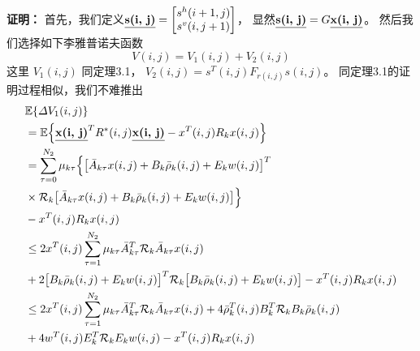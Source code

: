 	{\bf 证明：} 
	首先，我们定义$\emph{\textbf{s(i, j)}} = \begin{bmatrix}
	s^{h}(i+1,j)\\ s^{v}(i,j+1)
	\end{bmatrix}$，  显然$\emph{\textbf{s(i, j)}}=G\emph{\textbf{x(i, j)}}$。 然后我们选择如下李雅普诺夫函数
	\begin{equation}\label{LyapunoovT}
	V(i,j)=V_{1}(i,j)+V_{2}(i,j)
	\end{equation}
	这里 $V_{1}(i,j)$ 同定理3.1， $V_{2}(i,j)=s^{T}(i,j)F_{r(i,j)}s(i,j)$。 同定理3.1的证明过程相似，我们不难推出
	\begin{equation} \label{P2T1}
	\begin{split}
	&\mathbb{E}\{\varDelta V_{1}(i,j) \}\\
	&=\mathbb{E}\Big\{\emph{\textbf{x(i, j)}}^{T}R^{*}(i,j)\emph{\textbf{x(i, j)}} - x^{T}(i,j)R_{k}x(i,j)\Big\}\\
	&=  \sum_{\tau =0}^{N_{2}}\mu_{k\tau }\Big\{\big[\bar{A}_{k\tau }x(i,j)+B_{k}\bar{\rho}_{k}(i,j)+E_{k}w(i,j)\big]^{T}\\
	&\times\mathcal{R}_{k} \big[ \bar{A}_{k\tau }x(i,j)+B_{k}\bar{\rho}_{k}(i,j)+E_{k}w(i,j)\big]\Big\}\\
	&-x^{T}(i,j)R_{k}x(i,j)\\
	&\leq 2x^{T}(i,j)\sum_{\tau =1}^{N_{2}}\mu_{k\tau }\bar{A}^{T}_{k\tau }\mathcal{R}_{k}\bar{A}_{k\tau }x(i,j) \\
	&+2\big[B_{k}\bar{\rho}_{k}(i,j)+E_{k}w(i,j)\big]^{T}\mathcal{R}_{k} \big[B_{k}\bar{\rho}_{k}(i,j)+E_{k}w(i,j)\big]
	-x^{T}(i,j)R_{k}x(i,j)\\
	&\leq 2x^{T}(i,j)\sum_{\tau =1}^{N_{2}}\mu_{k\tau }\bar{A}^{T}_{k\tau }\mathcal{R}_{k}\bar{A}_{k\tau }x(i,j) 
	+ 4\bar{\rho}^{T}_{k}(i,j)B^{T}_{k}\mathcal{R}_{k}B_{k}\bar{\rho}_{k}(i,j)\\
	&+4w^{T}(i,j)E^{T}_{k}\mathcal{R}_{k}E_{k}w(i,j)
	-x^{T}(i,j)R_{k}x(i,j)

\end{split}
\end{equation}
